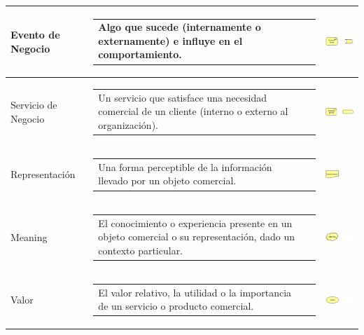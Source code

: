 \begin{longtable}[c]{|p{2.5cm}|l|c|}
	Evento de Negocio    		& \begin{tabular}[c]{p{7cm}@{}l@{}}Algo que sucede (internamente o externamente) e influye en el comportamiento.\end{tabular} & \includegraphics[width=35mm]{arquitectura/adm_lenguaje/imgs/business/BusinessEvent}          \\ \hline
	Servicio de Negocio    		& \begin{tabular}[c]{p{7cm}@{}l@{}}Un servicio que satisface una necesidad comercial de un cliente (interno o externo al organización).\end{tabular} & \includegraphics[width=35mm]{arquitectura/adm_lenguaje/imgs/business/BusinessService}          \\ \hline
	Representación    			& \begin{tabular}[c]{p{7cm}@{}l@{}}Una forma perceptible de la información llevado por un objeto comercial.\end{tabular} & \includegraphics[width=35mm]{arquitectura/adm_lenguaje/imgs/business/Representation}          \\ \hline
	Meaning    					& \begin{tabular}[c]{p{7cm}@{}l@{}}El conocimiento o experiencia presente en un objeto comercial o su representación, dado un contexto particular.\end{tabular} & \includegraphics[width=35mm]{arquitectura/adm_lenguaje/imgs/business/Meaning}          \\ \hline
	Valor    					& \begin{tabular}[c]{p{7cm}@{}l@{}}El valor relativo, la utilidad o la importancia de un servicio o producto comercial.\end{tabular} & \includegraphics[width=35mm]{arquitectura/adm_lenguaje/imgs/business/Value}          \\ \hline

\end{longtable}
